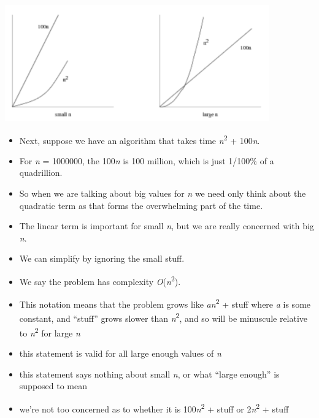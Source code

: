 \documentclass{beamer}
\begin{document}
\begin{frame}
\includegraphics[height=5cm,keepaspectratio]{images/image1}
\end{frame} 

\begin{frame}
\begin{itemize}
\item Next, suppose we have an algorithm that takes time \textit{n}\textsuperscript{2 }+ 100\textit{n}.
\item For \textit{n }= 1000000, the 100\textit{n }is 100 million, which is just 1/100\% of a quadrillion.
\item So when we are talking about big values for \textit{n }we need only think about the quadratic term as that forms
the overwhelming part of the time.
\item The linear term is important for small \textit{n}, but we are really concerned with big \textit{n}.
\item We can simplify by ignoring the small stuff.
\end{itemize}
\end{frame} 

\begin{frame}
\begin{itemize}
\item We say the problem has complexity \textit{O}(\textit{n}\textsuperscript{2}). 
\item This notation means that the problem grows like \textit{an}\textsuperscript{2 }+ stuff where \textit{a }is some constant, and ``stuff''
grows slower than \textit{n}\textsuperscript{2}, and so will be minuscule relative to \textit{n}\textsuperscript{2 }for
large \textit{n}
\item this statement is valid for all large enough values of \textit{n }
\item this statement says nothing about small \textit{n}, or what ``large enough'' is supposed to mean
\item we're not too concerned as to whether it is 100\textit{n}\textsuperscript{2 }+ stuff or
2\textit{n}\textsuperscript{2 }+ stuff
\end{itemize}
\end{frame} 
\end{document}

